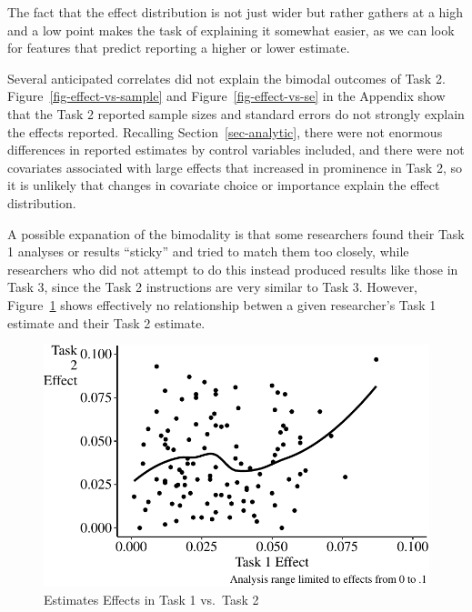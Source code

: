\documentclass[
  letterpaper,
  DIV=11,
  numbers=noendperiod]{scrartcl}
\begin{document}
The fact that the effect distribution is not just wider but rather
gathers at a high and a low point makes the task of explaining it
somewhat easier, as we can look for features that predict reporting a
higher or lower estimate.

Several anticipated correlates did not explain the bimodal outcomes of
Task 2. Figure~\ref{fig-effect-vs-sample} and
Figure~\ref{fig-effect-vs-se} in the Appendix show that the Task 2
reported sample sizes and standard errors do not strongly explain the
effects reported. Recalling Section~\ref{sec-analytic}, there were not
enormous differences in reported estimates by control variables
included, and there were not covariates associated with large effects
that increased in prominence in Task 2, so it is unlikely that changes
in covariate choice or importance explain the effect distribution.

A possible expanation of the bimodality is that some researchers found
their Task 1 analyses or results ``sticky'' and tried to match them too
closely, while researchers who did not attempt to do this instead
produced results like those in Task 3, since the Task 2 instructions are
very similar to Task 3. However, Figure~\ref{fig-task-1-vs-2} shows
effectively no relationship betwen a given researcher's Task 1 estimate
and their Task 2 estimate.

\begin{figure}

{\centering \includegraphics{The-Sources-of-Researcher-Variation-in-Economics_files/figure-pdf/fig-task-1-vs-2-1.pdf}

}

\caption{\label{fig-task-1-vs-2}Estimates Effects in Task 1 vs.~Task 2}

\end{figure}
\end{document}
